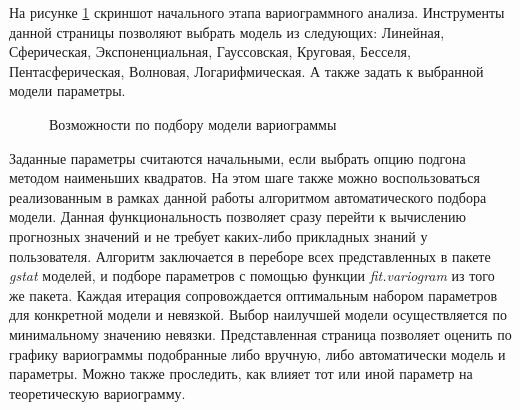 На рисунке \ref{img:mod_variogram} скриншот начального этапа вариограммного анализа. Инструменты данной страницы позволяют выбрать модель из следующих: Линейная, Сферическая, Экспоненциальная, Гауссовская, Круговая, Бесселя, Пентасферическая, Волновая, Логарифмическая. А также задать к выбранной модели параметры.
\begin{figure}[ht]
\caption{Возможности по подбору модели вариограммы}
\label{img:mod_variogram}
\end{figure}
Заданные параметры считаются начальными, если выбрать опцию подгона методом наименьших квадратов. На этом шаге также можно воспользоваться реализованным в рамках данной работы алгоритмом автоматического подбора модели. Данная функциональность позволяет сразу перейти к вычислению прогнозных значений и не требует каких-либо прикладных знаний у пользователя. Алгоритм заключается в переборе всех представленных в пакете \textit{gstat} моделей, и подборе параметров с помощью функции \textit{fit.variogram} из того же пакета. Каждая итерация сопровождается оптимальным набором параметров для конкретной модели и невязкой. Выбор наилучшей модели осуществляется по минимальному значению невязки. Представленная страница позволяет оценить по графику вариограммы подобранные либо вручную, либо автоматически модель и параметры. Можно также проследить, как влияет тот или иной параметр на теоретическую вариограмму.

